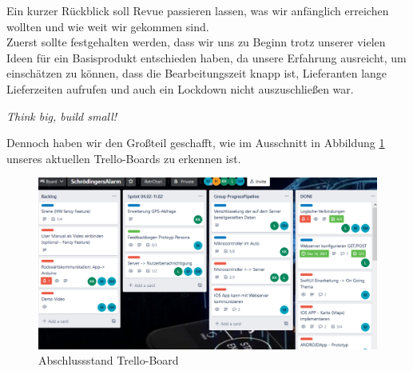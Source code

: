 
Ein kurzer Rückblick soll Revue passieren lassen, was wir anfänglich erreichen wollten und wie weit wir gekommen sind. 
\\
Zuerst sollte festgehalten werden, dass wir uns zu Beginn trotz unserer vielen Ideen für ein Basisprodukt entschieden haben, da unsere Erfahrung ausreicht, um einschätzen zu können, dass die Bearbeitungszeit knapp ist, Lieferanten lange Lieferzeiten aufrufen und auch ein Lockdown nicht auszuschließen war. 

\begin{center}
	\textit{Think big, build small!} \cite{Full2022}
\end{center}

Dennoch haben wir den Großteil geschafft, wie im Ausschnitt in Abbildung \ref{trello} unseres aktuellen Trello-Boards  zu erkennen ist.

\begin{figure} [H]
	\begin{center}
		\includegraphics[width=1\textwidth]{Bilder/Rueckblick_Vergleich.png}
		\caption{Abschlussstand Trello-Board}
		\label{trello}
	\end{center}
\end{figure}



